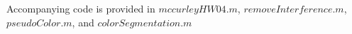 \documentclass{article}[12 pt]
\begin{document}
\begin{enumerate}

\end{enumerate}


 \noindent 
 Accompanying code is provided in $mccurleyHW04.m$, $removeInterference.m$, $pseudoColor.m$, and $colorSegmentation.m$
\end{document}

